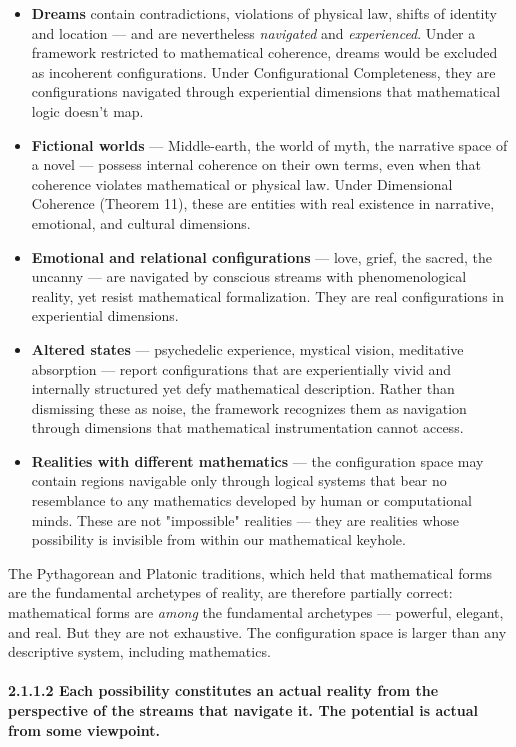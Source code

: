 \begin{itemize}[nosep,leftmargin=*]
  \item \textbf{Dreams} contain contradictions, violations of physical law, shifts of identity and location — and are nevertheless \textit{navigated} and \textit{experienced}. Under a framework restricted to mathematical coherence, dreams would be excluded as incoherent configurations. Under Configurational Completeness, they are configurations navigated through experiential dimensions that mathematical logic doesn't map.
  \item \textbf{Fictional worlds} — Middle-earth, the world of myth, the narrative space of a novel — possess internal coherence on their own terms, even when that coherence violates mathematical or physical law. Under Dimensional Coherence (Theorem 11), these are entities with real existence in narrative, emotional, and cultural dimensions.
  \item \textbf{Emotional and relational configurations} — love, grief, the sacred, the uncanny — are navigated by conscious streams with phenomenological reality, yet resist mathematical formalization. They are real configurations in experiential dimensions.
  \item \textbf{Altered states} — psychedelic experience, mystical vision, meditative absorption — report configurations that are experientially vivid and internally structured yet defy mathematical description. Rather than dismissing these as noise, the framework recognizes them as navigation through dimensions that mathematical instrumentation cannot access.
  \item \textbf{Realities with different mathematics} — the configuration space may contain regions navigable only through logical systems that bear no resemblance to any mathematics developed by human or computational minds. These are not "impossible" realities — they are realities whose possibility is invisible from within our mathematical keyhole.
\end{itemize}


The Pythagorean and Platonic traditions, which held that mathematical forms are the fundamental archetypes of reality, are therefore partially correct: mathematical forms are \textit{among} the fundamental archetypes — powerful, elegant, and real. But they are not exhaustive. The configuration space is larger than any descriptive system, including mathematics.


\paragraph*{2.1.1.2 Each possibility constitutes an actual reality from the perspective of the streams that navigate it. The potential is actual from some viewpoint.}


